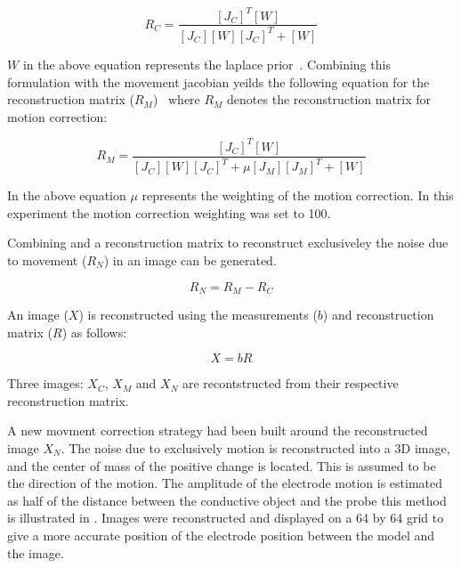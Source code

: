 \begin{equation}\label{eq:regular_rm}
	R_C = \frac{[J_C]^T [W]}{[J_C] [W] [J_C]^T + [W]}
\end{equation}

$W$ in the above equation represents the laplace prior~\parencite{soleimani_imaging_2006}.
Combining this formulation with the movement jacobian yeilds the following equation 
for the reconstruction matrix ($R_M$)~\parencite{soleimani_imaging_2006} where $R_M$
denotes the reconstruction matrix for motion correction:

\begin{equation}\label{eq:motion_rm}
	R_M = \frac{[J_C]^T [W]}{[J_C] [W] [J_C]^T + \mu [J_M][J_M]^T + [W]}
\end{equation}

In the above equation $\mu$ represents the weighting of the motion correction. 
In this experiment the motion correction weighting was set to 100. 

Combining  and  a reconstruction
matrix to reconstruct exclusiveley the noise due to movement ($R_N$) 
in an image can be generated.

\begin{equation}
	R_N = R_M - R_C
\end{equation}

An image ($X$) is reconstructed using 
the measurements ($b$) and reconstruction matrix ($R$) as follows:

\begin{equation}
	X = bR
\end{equation}

Three images: $X_C$, $X_M$ and $X_N$ are recontstructed from their 
respective reconstruction matrix. 

A new movment correction strategy had been built 
around the reconstructed image $X_N$.
The noise due to exclusively motion is reconstructed into a 
3D image, and the center of mass of the positive change is located. 
This is assumed to be the direction of the motion. The amplitude of the electrode 
motion is estimated as half of the distance between the 
conductive object and the probe this method is illustrated in
. Images were reconstructed and displayed 
on a 64 by 64 grid to give a more accurate position of the 
electrode position between the model and the image.

